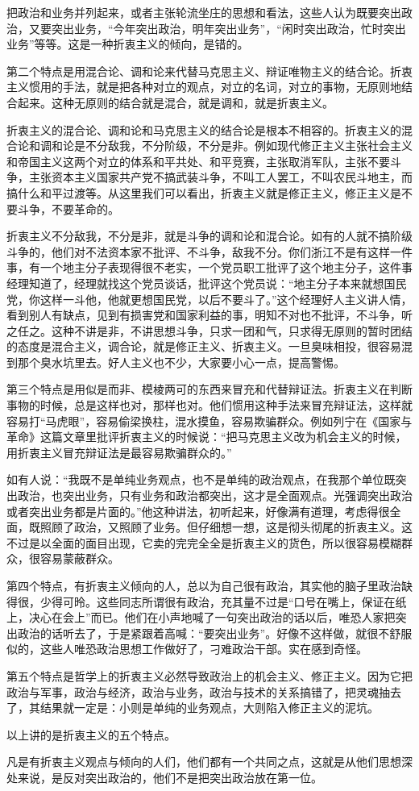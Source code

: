 把政治和业务并列起来，或者主张轮流坐庄的思想和看法，这些人认为既要突出政治，又要突出业务，“今年突出政治，明年突出业务”，“闲时突出政治，忙时突出业务”等等。这是一种折衷主义的倾向，是错的。

第二个特点是用混合论、调和论来代替马克思主义、辩证唯物主义的结合论。折衷主义惯用的手法，就是把各种对立的观点，对立的名词，对立的事物，无原则地结合起来。这种无原则的结合就是混合，就是调和，就是折衷主义。

折衷主义的混合论、调和论和马克思主义的结合论是根本不相容的。折衷主义的混合论和调和论是不分敌我，不分阶级，不分是非。例如现代修正主义主张社会主义和帝国主义这两个对立的体系和平共处、和平竞赛，主张取消军队，主张不要斗争，主张资本主义国家共产党不搞武装斗争，不叫工人罢工，不叫农民斗地主，而搞什么和平过渡等。从这里我们可以看出，折衷主义就是修正主义，修正主义是不要斗争，不要革命的。

折衷主义不分敌我，不分是非，就是斗争的调和论和混合论。如有的人就不搞阶级斗争的，他们对不法资本家不批评、不斗争，敌我不分。你们浙江不是有这样一件事，有一个地主分子表现得很不老实，一个党员职工批评了这个地主分子，这件事经理知道了，经理就找这个党员谈话，批评这个党员说：“地主分子本来就想国民党，你这样一斗他，他就更想国民党，以后不要斗了。”这个经理好人主义讲人情，看到别人有缺点，见到有损害党和国家利益的事，明知不对也不批评，不斗争，听之任之。这种不讲是非，不讲思想斗争，只求一团和气，只求得无原则的暂时团结的态度是混合主义，调合论，就是修正主义、折衷主义。一旦臭味相投，很容易混到那个臭水坑里去。好人主义也不少，大家要小心一点，提高警惕。

第三个特点是用似是而非、模棱两可的东西来冒充和代替辩证法。折衷主义在判断事物的时候，总是这样也对，那样也对。他们惯用这种手法来冒充辩证法，这样就容易打“马虎眼”，容易偷梁换柱，混水摸鱼，容易欺骗群众。例如列宁在《国家与革命》这篇文章里批评折衷主义的时候说：“把马克思主义改为机会主义的时候，用折衷主义冒充辩证法是最容易欺骗群众的。”

如有人说：“我既不是单纯业务观点，也不是单纯的政治观点，在我那个单位既突出政治，也突出业务，只有业务和政治都突出，这才是全面观点。光强调突出政治或者突出业务都是片面的。”他这种讲法，初听起来，好像满有道理，考虑得很全面，既照顾了政治，又照顾了业务。但仔细想一想，这是彻头彻尾的折衷主义。这不过是以全面的面目出现，它卖的完完全全是折衷主义的货色，所以很容易模糊群众，很容易蒙蔽群众。

第四个特点，有折衷主义倾向的人，总以为自己很有政治，其实他的脑子里政治缺得很，少得可昤。这些同志所谓很有政治，充其量不过是“口号在嘴上，保证在纸上，决心在会上”而已。他们在小声地喊了一句突出政治的话以后，唯恐人家把突出政治的话听去了，于是紧跟着高喊：“要突出业务”。好像不这样做，就很不舒服似的，这些人唯恐政治思想工作做好了，刁难政治干部。实在感到奇怪。

第五个特点是哲学上的折衷主义必然导致政治上的机会主义、修正主义。因为它把政治与军事，政治与经济，政治与业务，政治与技术的关系搞错了，把灵魂抽去了，其结果就一定是：小则是单纯的业务观点，大则陷入修正主义的泥坑。

以上讲的是折衷主义的五个特点。

凡是有折衷主义观点与倾向的人们，他们都有一个共同之点，这就是从他们思想深处来说，是反对突出政治的，他们不是把突出政治放在第一位。


